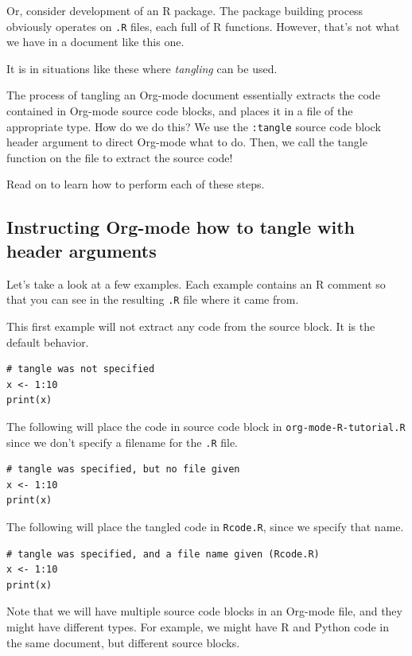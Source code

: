 \documentclass[11pt]{article}
\begin{document}
Or, consider development of an R package. The package building process
obviously operates on \texttt{.R} files, each full of R functions. However,
that's not what we have in a document like this one.

It is in situations like these where \emph{tangling} can be used. 

The process of tangling an Org-mode document essentially extracts the
code contained in Org-mode source code blocks, and places it in a file
of the appropriate type. How do we do this? We use the \texttt{:tangle}
source code block header argument to direct Org-mode what to do. Then,
we call the tangle function on the file to extract the source code!

Read on to learn how to perform each of these steps. 

\subsection*{Instructing Org-mode how to tangle with header arguments}
\label{sec-8-1}

Let's take a look at a few examples. Each example contains an R
comment so that you can see in the resulting \texttt{.R} file where it came
from.

This first example will not extract any code from the source block. It
is the default behavior.

\begin{verbatim}
# tangle was not specified
x <- 1:10
print(x)
\end{verbatim}

The following will place the code in source code block in
\texttt{org-mode-R-tutorial.R} since we don't specify a filename for the
\texttt{.R} file.

\begin{verbatim}
# tangle was specified, but no file given
x <- 1:10
print(x)
\end{verbatim}

The following will place the tangled code in \texttt{Rcode.R}, since we
specify that name.

\begin{verbatim}
# tangle was specified, and a file name given (Rcode.R)
x <- 1:10
print(x)
\end{verbatim}

Note that we will have multiple source code blocks in an Org-mode
file, and they might have different types. For example, we might have
R and Python code in the same document, but different source blocks.
\end{document}
